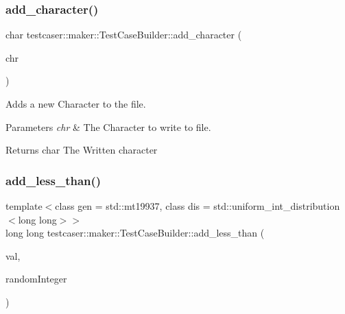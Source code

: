 \subsubsection{\texorpdfstring{add\_character()}{add\_character()}}
{\footnotesize\ttfamily char testcaser\+::maker\+::\+Test\+Case\+Builder\+::add\+\_\+character (\begin{DoxyParamCaption}\item[{char}]{chr }\end{DoxyParamCaption})\hspace{0.3cm}{\ttfamily [inline]}}



Adds a new Character to the file. 


\begin{DoxyParams}{Parameters}
{\em chr} & The Character to write to file. \\
\hline
\end{DoxyParams}
\begin{DoxyReturn}{Returns}
char The Written character 
\end{DoxyReturn}
\mbox{\label{classtestcaser_1_1maker_1_1TestCaseBuilder_a6649b1f108aae10780562876df58a5b2}} 
\subsubsection{\texorpdfstring{add\_less\_than()}{add\_less\_than()}\hspace{0.1cm}{\footnotesize\ttfamily [1/2]}}
{\footnotesize\ttfamily template$<$class gen  = std\+::mt19937, class dis  = std\+::uniform\+\_\+int\+\_\+distribution$<$long long$>$$>$ \\
long long testcaser\+::maker\+::\+Test\+Case\+Builder\+::add\+\_\+less\+\_\+than (\begin{DoxyParamCaption}\item[{long long}]{val,  }\item[{\mbox{\hyperlink{classtestcaser_1_1maker_1_1types_1_1RandomInteger}{types\+::\+Random\+Integer}}$<$ gen, dis $>$ \&}]{random\+Integer }\end{DoxyParamCaption})\hspace{0.3cm}{\ttfamily [inline]}}



